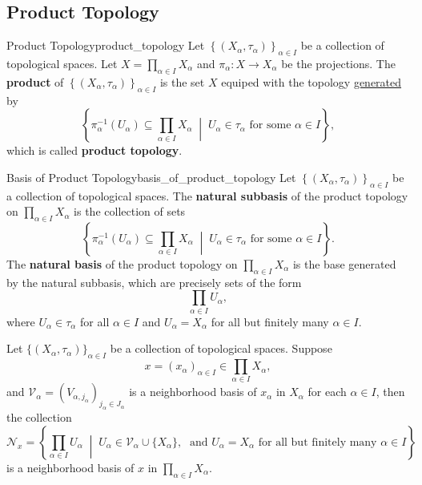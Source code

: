 \documentclass{report}
\begin{document}
\subsection{Product Topology}
\begin{definition}{Product Topology}{product_topology}
	Let $\left\{(X_\alpha,\tau_\alpha)\right\}_{\alpha\in I}$ be a collection of topological spaces. Let $X=\prod_{\alpha\in I}X_\alpha$ and $\pi_\alpha:X\to X_\alpha$ be the projections. The \textbf{product} of $\left\{(X_\alpha,\tau_\alpha)\right\}_{\alpha\in I}$ is the set $X$ equiped with the topology \hyperref[th:generated_topology]{generated} by
	\[
		\left\{\pi_\alpha^{-1}(U_\alpha)\subseteq\prod_{\alpha\in I}X_\alpha\;\middle|\; U_\alpha\in \tau_\alpha\text{ for some }\alpha\in I\right\},
	\]
	which is called \textbf{product topology}.
\end{definition}

\begin{definition}{Basis of Product Topology}{basis_of_product_topology}
	Let $\left\{(X_\alpha,\tau_\alpha)\right\}_{\alpha\in I}$ be a collection of topological spaces. The \textbf{natural subbasis} of the product topology on $\prod_{\alpha\in I}X_\alpha$ is the collection of sets 
	\[
		\left\{\pi_\alpha^{-1}(U_\alpha)\subseteq\prod_{\alpha\in I}X_\alpha\;\middle|\; U_\alpha\in \tau_\alpha\text{ for some }\alpha\in I\right\}.
	\]
	The \textbf{natural basis} of the product topology on $\prod_{\alpha\in I}X_\alpha$ is the base generated by the natural subbasis, which are precisely sets of the form
	\[
		\prod_{\alpha\in I}U_\alpha,
	\]
	where $U_\alpha\in \tau_\alpha$ for all $\alpha\in I$ and $U_\alpha=X_\alpha$ for all but finitely many $\alpha\in I$.
\end{definition}

\begin{proposition}{}{}
	Let $\{(X_\alpha,\tau_\alpha)\}_{\alpha\in I}$ be a collection of topological spaces. Suppose 
	\[
	   x=(x_\alpha)_{\alpha\in I}\in \prod_{\alpha\in I}X_\alpha,
	\]
	and $\mathcal{V}_\alpha=\left(V_{\alpha, j_\alpha}\right)_{j_\alpha\in J_\alpha}$ is a neighborhood basis of $x_\alpha$ in $X_\alpha$ for each $\alpha\in I$, then the collection
	\[
		\mathcal{N}_x =\left\{\prod_{\alpha\in I}U_{\alpha} \;\middle|\; U_\alpha\in \mathcal{V}_\alpha\cup\{X_\alpha\},\;\text{ and }U_{\alpha}=X_\alpha\text{ for all but finitely many }\alpha\in I\right\}
	\]
	is a neighborhood basis of $x$ in $\prod_{\alpha\in I}X_\alpha$.
\end{proposition}
\end{document}
